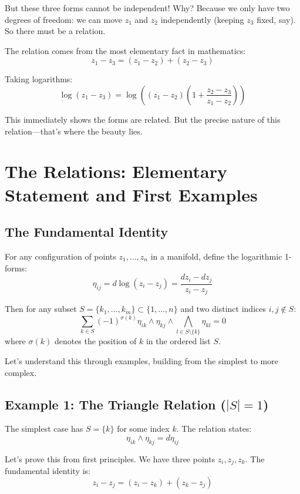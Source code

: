 But these three forms cannot be independent! Why? Because we only have two degrees of freedom: we can move $z_1$ and $z_2$ independently (keeping $z_3$ fixed, say). So there must be a relation.

The relation comes from the most elementary fact in mathematics:
$$z_1 - z_3 = (z_1 - z_2) + (z_2 - z_3)$$

Taking logarithms:
$$\log(z_1 - z_3) = \log((z_1 - z_2)(1 + \frac{z_2 - z_3}{z_1 - z_2}))$$

This immediately shows the forms are related. But the precise nature of this relation—that's where the beauty lies.

\section{The Relations: Elementary Statement and First Examples}

\subsection{The Fundamental Identity}

\begin{theorem}
For any configuration of points $z_1, \ldots, z_n$ in a manifold, define the logarithmic 1-forms:
$$\eta_{ij} = d\log(z_i - z_j) = \frac{dz_i - dz_j}{z_i - z_j}$$

Then for any subset $S = \{k_1, \ldots, k_m\} \subset \{1, \ldots, n\}$ and two distinct indices $i, j \notin S$:
$$\sum_{k \in S} (-1)^{\sigma(k)} \eta_{ik} \wedge \eta_{kj} \wedge \bigwedge_{l \in S\setminus\{k\}} \eta_{kl} = 0$$
where $\sigma(k)$ denotes the position of $k$ in the ordered list $S$.
\end{theorem}

Let's understand this through examples, building from the simplest to more complex.

\subsection{Example 1: The Triangle Relation ($|S| = 1$)}

The simplest case has $S = \{k\}$ for some index $k$. The relation states:
$$\eta_{ik} \wedge \eta_{kj} = d\eta_{ij}$$

Let's prove this from first principles. We have three points $z_i, z_j, z_k$. The fundamental identity is:
$$z_i - z_j = (z_i - z_k) + (z_k - z_j)$$

